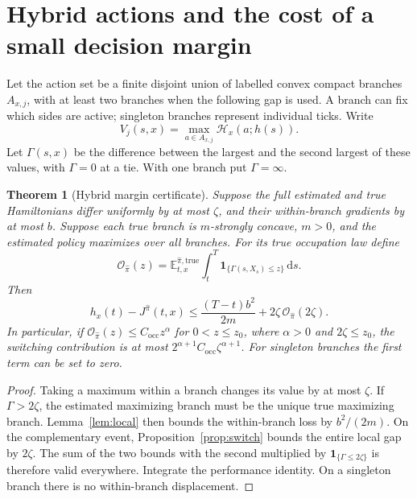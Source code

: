 \documentclass[11pt]{article}
\theoremstyle{plain}
\newtheorem{theorem}{Theorem}[section]
\theoremstyle{definition}
\theoremstyle{remark}
\newcommand{\E}{\mathbb E}
\newcommand{\dd}{\,\mathrm d}
\newcommand{\HH}{\mathcal H}
\begin{document}


\section{Hybrid actions and the cost of a small decision margin}

Let the action set be a finite disjoint union of labelled convex
compact branches \(A_{x,j}\), with at least two branches when the
following gap is used. A branch can fix which sides are active;
singleton branches represent individual ticks. Write
\[
V_j(s,x)=\max_{a\in A_{x,j}}\HH_x(a;h(s)).
\]
Let \(\Gamma(s,x)\) be the difference between the largest and the
second largest of these values, with \(\Gamma=0\) at a tie.
With one branch put \(\Gamma=\infty\).

\begin{theorem}[Hybrid margin certificate]\label{thm:hybrid}
Suppose the full estimated and true Hamiltonians differ uniformly
by at most \(\zeta\), and their within-branch gradients by at most
\(b\). Suppose each true branch is \(m\)-strongly concave,
\(m>0\), and the estimated policy maximizes over all branches.
For its true occupation law define
\[
\mathcal O_{\widehat\pi}(z)=
\E^{\widehat\pi,\mathrm{true}}_{t,x}
\int_t^T\mathbf1_{\{\Gamma(s,X_s)\le z\}}\dd s .
\]
Then
\begin{equation}\label{eq:hybrid}
h_x(t)-J^{\widehat\pi}(t,x)
\le \frac{(T-t)b^2}{2m}
       +2\zeta\,\mathcal O_{\widehat\pi}(2\zeta).
\end{equation}
In particular, if
\(\mathcal O_{\widehat\pi}(z)\le C_{\mathrm{occ}}z^\alpha\)
for \(0<z\le z_0\), where \(\alpha>0\) and \(2\zeta\le z_0\), the
switching contribution is at most
\(2^{\alpha+1}C_{\mathrm{occ}}\zeta^{\alpha+1}\).
For singleton branches the first term can be set to zero.
\end{theorem}
\begin{proof}
Taking a maximum within a branch changes its value by at most
\(\zeta\). If \(\Gamma>2\zeta\), the estimated maximizing branch
must be the unique true maximizing branch. Lemma~\ref{lem:local}
then bounds the within-branch loss by \(b^2/(2m)\).
On the complementary event, Proposition~\ref{prop:switch} bounds
the entire local gap by \(2\zeta\).
The sum of the two bounds with the second multiplied by
\(\mathbf1_{\{\Gamma\le2\zeta\}}\) is therefore valid everywhere.
Integrate the performance identity. On a singleton branch there
is no within-branch displacement.
\end{proof}
\end{document}
